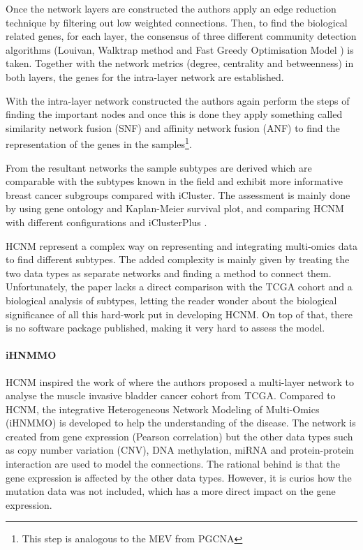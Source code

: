 Once the network layers are constructed the authors apply an edge reduction technique by filtering out low weighted connections. Then, to find the biological related genes, for each layer, the consensus of three different community detection algorithms (Louivan\cite{Blondel2008-ik}, Walktrap method \citet{Pons2005-oa} and Fast Greedy Optimisation Model \citet{Clauset2004-em}) is taken. Together with the network metrics (degree, centrality and betweenness) in both layers, the genes for the intra-layer network are established.

With the intra-layer network constructed the authors again perform the steps of finding the important nodes and once this is done they apply something called similarity network fusion (SNF) and affinity network fusion (ANF) to find the representation of the genes in the samples\footnote{This step is analogous to the MEV from PGCNA}. 

From the resultant networks the sample subtypes are derived which are comparable with the subtypes known in the field and exhibit more informative breast cancer subgroups compared with iCluster. The assessment is mainly done by using gene ontology and Kaplan-Meier survival plot, and comparing HCNM with different configurations and iClusterPlus \citet{Mo2013-zi}. 

HCNM represent a complex way on representing and integrating multi-omics data to find different subtypes. The added complexity is mainly given by treating the two data types as separate networks and finding a method to connect them. Unfortunately, the paper lacks a direct comparison with the TCGA cohort and a biological analysis of subtypes, letting the reader wonder about the biological significance of all this hard-work put in developing HCNM. On top of that, there is no software package published, making it very hard to assess the model. 

\paragraph*{iHNMMO} \label{s:lit:iHNMMO}

HCNM inspired the work of \citet{Peng2017-ik} where the authors proposed a multi-layer network to analyse the muscle invasive bladder cancer cohort from TCGA. Compared to HCNM, the integrative Heterogeneous Network Modeling of Multi-Omics (iHNMMO) is developed to help the understanding of the disease. The network is created from gene expression (Pearson correlation) but the other data types such as copy number variation (CNV), DNA methylation, miRNA and protein-protein interaction are used to model the connections. The rational behind is that the gene expression is affected by the other data types. However, it is curios how the mutation data was not included, which has a more direct impact on the gene expression.

